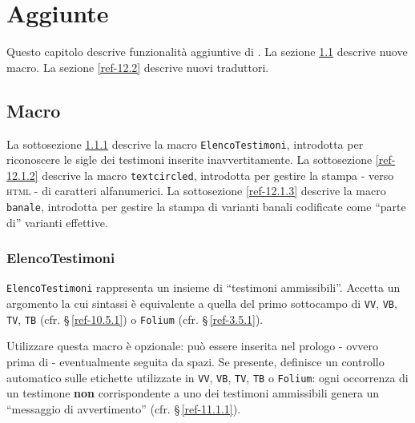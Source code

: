 \chapter{Aggiunte}
\label{ref-12}

Questo capitolo descrive funzionalit{\`a} aggiuntive di {\mtex}. 
La sezione \ref{ref-12.1} descrive nuove macro. 
La sezione \ref{ref-12.2} descrive nuovi traduttori.

\section{Macro}
\label{ref-12.1}

La sottosezione \ref{ref-12.1.1} descrive la macro \verb"ElencoTestimoni", introdotta per riconoscere le sigle dei testimoni inserite inavvertitamente.
La sottosezione \ref{ref-12.1.2} descrive la macro \verb"textcircled", introdotta per gestire la stampa - verso \textsc{html} - di caratteri alfanumerici.
La sottosezione \ref{ref-12.1.3} descrive la macro \verb"banale", introdotta per gestire la stampa di varianti banali codificate come ``parte di'' varianti effettive.

\subsection{ElencoTestimoni}
\label{ref-12.1.1}

\verb"ElencoTestimoni" rappresenta un insieme di ``testimoni ammissibili''. Accetta un argomento la cui sintassi {\`e} equivalente a quella del primo sottocampo di \verb"VV", \verb"VB", \verb"TV", \verb"TB" (cfr. \S\,\ref{ref-10.5.1}) o \verb"Folium" (cfr. \S\,\ref{ref-3.5.1}). 

Utilizzare questa macro {\`e} opzionale: pu{\`o} essere inserita nel prologo - ovvero prima di \verb"" - eventualmente seguita da spazi. Se presente, definisce un controllo automatico sulle etichette utilizzate in \verb"VV", \verb"VB", \verb"TV", \verb"TB" o \verb"Folium": ogni occorrenza di un testimone \textbf{non} corrispondente a uno dei testimoni ammissibili genera un ``messaggio di avvertimento'' (cfr. \S\,\ref{ref-11.1.1}).

